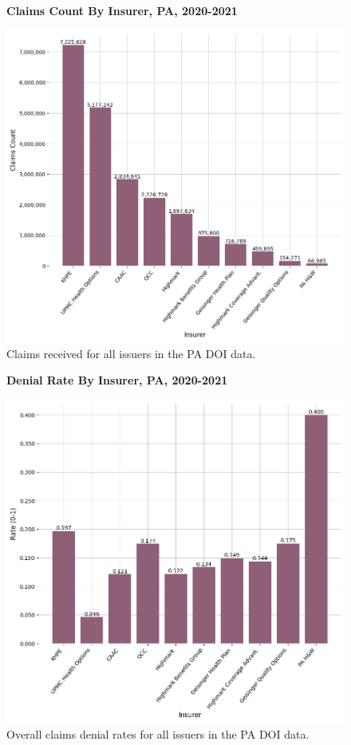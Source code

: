 \documentclass[12pt, a4paper,twoside]{report}
\theoremstyle{plain} %
\theoremstyle{definition} %
\theoremstyle{remark} %
\numberwithin{equation}{chapter}
\begin{document}
		\begin{figure}[h!]
			\centering
			\textbf{Claims Count By Insurer, PA, 2020-2021}\par\medskip
			\includegraphics[width=\columnwidth]{images/pa_claims/claims_by_insurer.png}
			\caption{Claims received for all issuers in the PA DOI data.}
			\label{painsurerclaims}
		\end{figure}
		
		\clearpage
		
		
		\begin{figure}[h!]
			\centering
			\textbf{Denial Rate By Insurer, PA, 2020-2021}\par\medskip
			\includegraphics[width=\columnwidth]{images/pa_claims/denial_rate_by_insurer.png}
			\caption{Overall claims denial rates for all issuers in the PA DOI data.}
			\label{painsurerdenialrates}
		\end{figure}
		
\end{document}
